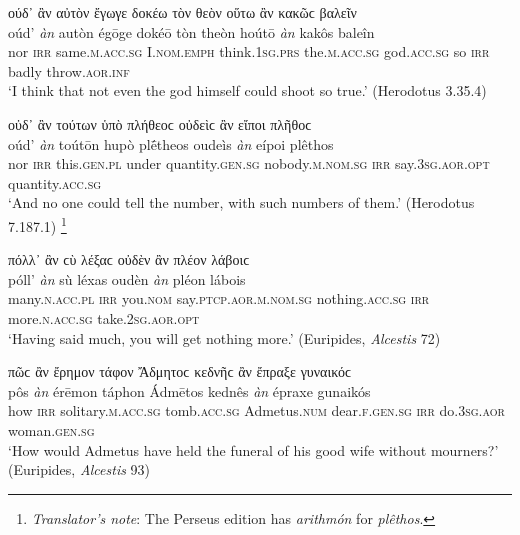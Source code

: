 \begin{exe}
\ex ούδ᾽ ἂν αὐτὸν ἔγωγε δοκέω τὸν θεὸν οὕτω ἂν κακῶϲ βαλεῖν\\
\gll oúd' \emph{àn} autòn égōge dokéō tòn theòn hoútō \emph{àn} kakôs baleîn\\
nor \textsc{irr} same.\textsc{m.acc.sg} I.\textsc{nom.emph} think.\textsc{1sg.prs} the.\textsc{m.acc.sg} god.\textsc{acc.sg} so \textsc{irr} badly throw.\textsc{aor.inf}\\
\trans `I think that not even the god himself could shoot so true.' (Herodotus 3.35.4)
\label{multian22}
\end{exe}

\largerpage[2]
\begin{exe}
\ex οὐδ᾽ ἂν τούτων ὑπὸ πλήθεοϲ οὐδεὶϲ ἂν εἴποι πλῆθοϲ\\
\gll oúd' \emph{àn} toútōn hupò plḗtheos oudeìs \emph{àn} eípoi plêthos\\
nor \textsc{irr} this.\textsc{gen.pl} under quantity.\textsc{gen.sg} nobody.\textsc{m.nom.sg} \textsc{irr} say.\textsc{3sg.aor.opt} quantity.\textsc{acc.sg}\\
\trans `And no one could tell the number, with such numbers of them.' (Herodotus 7.187.1)
\label{multian23}\footnote{\emph{Translator's note}: The Perseus edition has \textit{arithmón} for \textit{plêthos}.}
\end{exe}
\clearpage

\begin{exe}
\ex πόλλ᾽ ἂν ϲὺ λέξαϲ οὐδὲν ἂν πλέον λάβοιϲ\\
\gll póll' \emph{àn} sù léxas oudèn \emph{àn} pléon lábois\\
many.\textsc{n.acc.pl} \textsc{irr} you.\textsc{nom} say.\textsc{ptcp.aor.m.nom.sg} nothing.\textsc{acc.sg} \textsc{irr} more.\textsc{n.acc.sg} take.\textsc{2sg.aor.opt}\\
\trans `Having said much, you will get nothing more.' (Euripides, \textit{Alcestis} 72)
\label{multian24}
\end{exe}

\begin{exe}
\ex πῶϲ ἂν ἔρημον τάφον Ἄδμητοϲ κεδνῆϲ ἂν ἔπραξε γυναικόϲ\\
\gll pôs \emph{àn} érēmon táphon Ádmētos kednês \emph{àn} épraxe gunaikós\\
how \textsc{irr} solitary.\textsc{m.acc.sg} tomb.\textsc{acc.sg} Admetus.\textsc{num} dear.\textsc{f.gen.sg} \textsc{irr} do.\textsc{3sg.aor} woman.\textsc{gen.sg}\\
\trans `How would Admetus have held the funeral of his good wife without mourners?' (Euripides, \textit{Alcestis} 93)
\label{multian25}
\end{exe}

